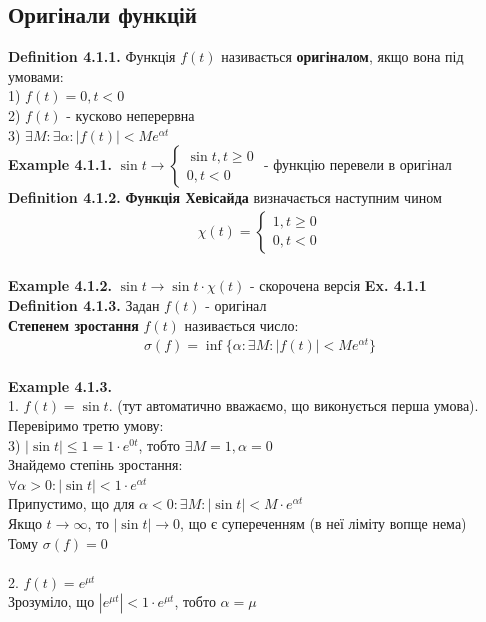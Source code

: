 \documentclass[a4paper, 14pt]{extarticle}
\def\hugespace{\vspace{5mm} \\}
\begin{document}
\subsection{Оригінали функцій}
\textbf{Definition 4.1.1.} Функція $f(t)$ називається \textbf{оригіналом}, якщо вона під умовами:\\
1) $f(t) = 0, t<0$\\
2) $f(t)$ - кусково неперервна\\
3) $\exists M: \exists \alpha: |f(t)|<Me^{\alpha t}$
\hugespace
\textbf{Example 4.1.1.} $\sin t \to \begin{cases} \sin t, t \geq 0 \\ 0, t < 0 \end{cases}$ - функцію перевели в оригінал
\hugespace
\textbf{Definition 4.1.2.} \textbf{Функція Хевісайда} визначається наступним чином
\begin{align*}
\chi(t) = \begin{cases} 1, t \geq 0 \\ 0, t < 0 \end{cases}
\end{align*}
\\
\textbf{Example 4.1.2.} $\sin t \to \sin t \cdot \chi(t)$ - скорочена версія \textbf{Ex. 4.1.1}
\hugespace
\textbf{Definition 4.1.3.} Задан $f(t)$ - оригінал\\
\textbf{Степенем зростання} $f(t)$ називається число:
\begin{align*}
\sigma(f) = \inf\{\alpha: \exists M: |f(t)| < Me^{\alpha t}\}
\end{align*}
\\
\textbf{Example 4.1.3.}\\
1. $f(t) = \sin t$. (тут автоматично вважаємо, що виконується перша умова). Перевіримо третю умову:\\
3) $|\sin t| \leq 1 = 1 \cdot e^{0t}$, тобто $\exists M=1, \alpha = 0$\\
Знайдемо степінь зростання:\\
$\forall \alpha > 0: |\sin t| < 1\cdot e^{\alpha t}$\\
Припустимо, що для $\alpha < 0: \exists M: |\sin t| < M\cdot e^{\alpha t}$\\
Якщо $t \to \infty$, то $|\sin t| \to 0$, що є супереченням (в неї ліміту вопще нема)\\
Тому $\sigma(f) = 0$\\
\\
2. $f(t) = e^{\mu t}$\\
Зрозуміло, що $|e^{\mu t}| < 1\cdot e^{\mu t}$, тобто $\alpha = \mu$\\
\end{document}
